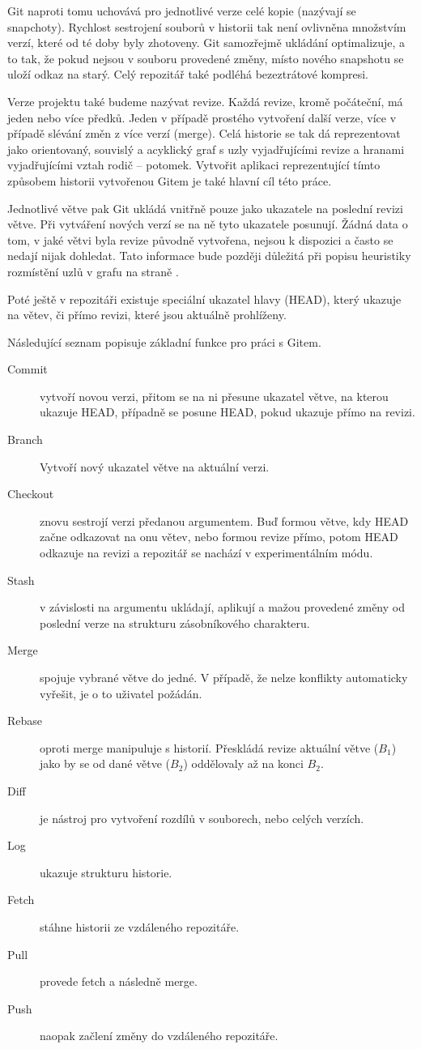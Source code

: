 \documentclass[
  biblatex,
  glossaries,
  index
]{kidiplom}
\begin{document}
Git naproti tomu uchovává pro jednotlivé verze celé kopie (nazývají se snapchoty). Rychlost sestrojení souborů v historii tak není ovlivněna množstvím verzí, které od té doby byly zhotoveny. Git samozřejmě ukládání optimalizuje, a to tak, že pokud nejsou v souboru provedené změny, místo nového snapshotu se uloží odkaz na starý. Celý repozitář také podléhá bezeztrátové kompresi.

Verze projektu také budeme nazývat revize. Každá revize, kromě počáteční, má jeden nebo více předků. Jeden v případě prostého vytvoření další verze, více v případě slévání změn z více verzí (merge). Celá historie se tak dá reprezentovat jako orientovaný, souvislý a acyklický graf s uzly vyjadřujícími revize a hranami vyjadřujícími vztah rodič -- potomek. Vytvořit aplikaci reprezentující tímto způsobem historii vytvořenou Gitem je také hlavní cíl této práce.

Jednotlivé větve pak Git ukládá vnitřně pouze jako ukazatele na poslední revizi větve. Při vytváření nových verzí se na ně tyto ukazatele posunují. Žádná data o tom, v jaké větvi byla revize původně vytvořena, nejsou k dispozici a často se nedají nijak dohledat. Tato informace bude později důležitá při popisu heuristiky rozmístění uzlů v grafu na straně \pageref{subsec:algorithm}.

Poté ještě v repozitáři existuje speciální ukazatel hlavy (HEAD), který ukazuje na větev, či přímo revizi, které jsou aktuálně prohlíženy.

Následující seznam popisuje základní funkce pro práci s Gitem.

\begin{description}
  \item[Commit]  vytvoří novou verzi, přitom se na ni přesune ukazatel větve, na kterou ukazuje HEAD, případně se posune HEAD, pokud ukazuje přímo na revizi.
  \item[Branch] Vytvoří nový ukazatel větve na aktuální verzi.
  \item[Checkout] znovu sestrojí verzi předanou argumentem. Buď formou větve, kdy HEAD začne odkazovat na onu větev, nebo formou revize přímo, potom HEAD odkazuje na revizi a repozitář se nachází v experimentálním módu.
  \item[Stash] v závislosti na argumentu ukládají, aplikují a mažou provedené změny od poslední verze na strukturu zásobníkového charakteru.
  \item[Merge] spojuje vybrané větve do jedné. V případě, že nelze konflikty automaticky vyřešit, je o to uživatel požádán.
  \item[Rebase] oproti merge manipuluje s historií. Přeskládá revize aktuální větve ($B_1$) jako by se od dané větve ($B_2$) oddělovaly až na konci $B_2$.
  \item[Diff] je nástroj pro vytvoření rozdílů v souborech, nebo celých verzích.
  \item[Log] ukazuje strukturu historie.
  \item[Fetch] stáhne historii ze vzdáleného repozitáře.
  \item[Pull] provede fetch a následně merge.
  \item[Push] naopak začlení změny do vzdáleného repozitáře.
\end{description}
\end{document}
